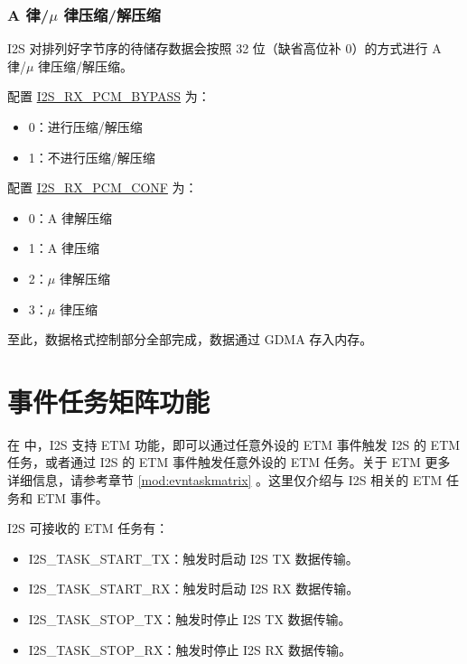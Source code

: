 \documentclass[main\_\_CN.tex]{subfiles}
\begin{document}
\subsubsection{A 律/$\mu$ 律压缩/解压缩} 

I2S 对排列好字节序的待储存数据会按照 32 位（缺省高位补 0）的方式进行 A 律/$\mu$ 律压缩/解压缩。

配置 \hyperref[fielddesc:I2SRXPCMBYPASS]{I2S\_RX\_PCM\_BYPASS} 为：
\begin{itemize}
\item 0：进行压缩/解压缩
\item 1：不进行压缩/解压缩
\end{itemize}
配置 \hyperref[fielddesc:I2SRXPCMCONF]{I2S\_RX\_PCM\_CONF} 为：
\begin{itemize}
\item 0：A 律解压缩
\item 1：A 律压缩
\item 2：$\mu$ 律解压缩
\item 3：$\mu$ 律压缩
\end{itemize}

至此，数据格式控制部分全部完成，数据通过 GDMA 存入内存。

\section{事件任务矩阵功能} \label{sec:i2s-etm-func}

在 \chipname{} 中，I2S 支持 ETM 功能，即可以通过任意外设的 ETM 事件触发 I2S 的 ETM 任务，或者通过 I2S 的 ETM 事件触发任意外设的 ETM 任务。关于 ETM 更多详细信息，请参考章节 \ref{mod:evntaskmatrix} 。这里仅介绍与 I2S 相关的 ETM 任务和 ETM 事件。

I2S 可接收的 ETM 任务有：

\begin{itemize}
    \item \label{task:I2STASKSTARTTX}I2S\_TASK\_START\_TX：触发时启动 I2S TX 数据传输。
    \item \label{task:I2STASKSTARTRX}I2S\_TASK\_START\_RX：触发时启动 I2S RX 数据传输。
    \item \label{task:I2STASKSTOPTX}I2S\_TASK\_STOP\_TX：触发时停止 I2S TX 数据传输。
    \item \label{task:I2STASKSTOPRX}I2S\_TASK\_STOP\_RX：触发时停止 I2S RX 数据传输。
\end{itemize}
\end{document}
